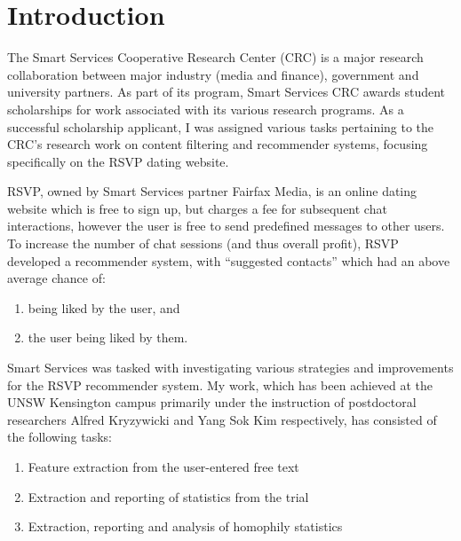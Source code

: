 \documentclass{report}
\begin{document}
\maketitle
\tableofcontents

\chapter{Introduction}

The Smart Services Cooperative Research Center (CRC) is a major research collaboration between major industry (media and finance), government and university partners. As part of its program, Smart Services CRC awards student scholarships for work associated with its various research programs. As a successful scholarship applicant, I was assigned various tasks pertaining to the CRC's research work on content filtering and recommender systems, focusing specifically on the RSVP dating website.

RSVP, owned by Smart Services partner Fairfax Media, is an online dating website which is free to sign up, but charges a fee for subsequent chat interactions, however the user is free to send predefined messages to other users. To increase the number of chat sessions (and thus overall profit), RSVP developed a recommender system, with ``suggested contacts'' which had an above average chance of:
\begin{enumerate}
  \item being liked by the user, and
  \item the user being liked by them.
\end{enumerate}

Smart Services was tasked with investigating various strategies and improvements for the RSVP recommender system. My work, which has been achieved at the UNSW Kensington campus primarily under the instruction of postdoctoral researchers Alfred Kryzywicki and Yang Sok Kim respectively, has consisted of the following tasks:
\begin{enumerate}
  \item Feature extraction from the user-entered free text
  \item Extraction and reporting of statistics from the trial
  \item Extraction, reporting and analysis of homophily statistics
\end{enumerate}
\end{document}
